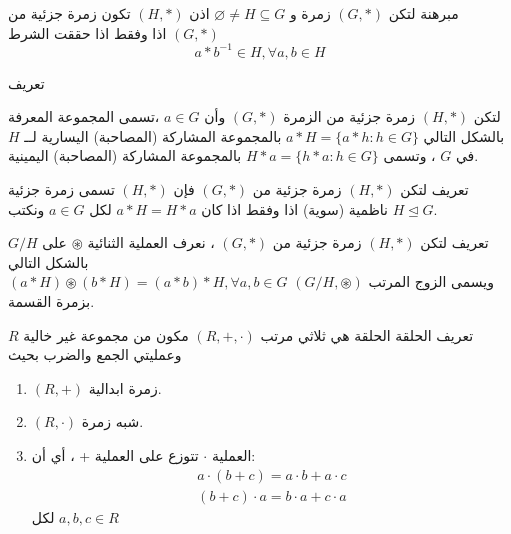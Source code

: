 	\begin{frame}
		\begin{exampleblock}{مبرهنة}
				لتكن $(G, *)$ زمرة و $\varnothing\neq H\subseteq G$ اذن $(H, *)$ تكون زمرة جزئية من $(G, *)$ اذا وفقط اذا حققت الشرط 
			\[
			a * b^{-1} \in H, \forall a, b\in H
			\]
		\end{exampleblock}
		
		\pause
		\begin{exampleblock}{تعريف}
			
			لتكن $(H, *)$ زمرة جزئية من الزمرة $(G, *)$ وأن $a\in G$ ،تسمى  المجموعة المعرفة بالشكل التالي 
			$a* H = \{a * h : h\in G\}$
			بالمجموعة المشاركة (المصاحبة)  اليسارية لــ $H$ في $G$  ، وتسمى $H*a = \{h*a:h\in G\}$ بالمجموعة المشاركة (المصاحبة) اليمينية. 
		\end{exampleblock}
		
		\pause
		\begin{exampleblock}{تعريف}
			 	لتكن $(H, *)$ زمرة جزئية من $(G, *)$ فإن $(H, *)$ تسمى زمرة جزئية ناظمية (سوية) اذا وفقط اذا كان $a*H = H*a$ لكل $a\in G$ ونكتب $ H \trianglelefteq G$.
		\end{exampleblock}
	\end{frame}
	
	\begin{frame}
		\begin{exampleblock}{تعريف}
			  	لتكن $(H, *)$ زمرة جزئية من $(G , *)$ ، نعرف العملية الثنائية $\circledast$ على $G/H$ بالشكل التالي\\
			$
			(a*H)\circledast (b*H) = (a*b) *H, \forall a, b\in G
			$
			ويسمى الزوج المرتب $(G/H, \circledast)$ بزمرة القسمة.
		\end{exampleblock}
		
		\pause
		\begin{exampleblock}{تعريف الحلقة}
			 	الحلقة هي ثلاثي مرتب $(R, +, \cdot)$ مكون من مجموعة غير خالية $R$ وعمليتي الجمع والضرب بحيث 
			\begin{enumerate}
				\item $(R, +)$ زمرة ابدالية.
				\item  $(R, \cdot) $ شبه زمرة.
				\item العملية $\cdot$ تتوزع على العملية + ، أي أن:
				\begin{gather*}
					a\cdot (b+c) = a\cdot b + a\cdot c \tag{التوزيع من اليسار}\\
					(b + c) \cdot a = b\cdot a + c\cdot a \tag{التوزيع من اليمين}
				\end{gather*}
				لكل $a ,b,c\in R$
			\end{enumerate}
		\end{exampleblock}
	\end{frame}
	
